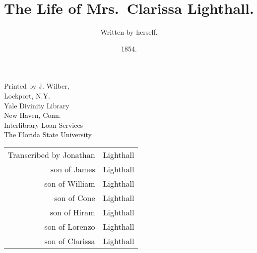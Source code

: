 \documentclass{article}
\title{The Life of Mrs.\ Clarissa Lighthall.}
\author{Written by herself.}
\date{1854.}
\begin{document}
\maketitle

\noindent Printed by J. Wilber,\\
Lockport, N.Y.\\

\noindent %
Yale Divinity Library\\
New Haven, Conn.\\

\noindent %
Interlibrary Loan Services\\
The Florida State University\\%

{\hspace*{-24pt} %
\begin{tabular}{r@{ }l}
Transcribed by Jonathan &Lighthall\\
son of James &Lighthall\\
son of William &Lighthall\\
son of Cone &Lighthall\\
son of Hiram &Lighthall\\
son of Lorenzo &Lighthall\\
son of Clarissa &Lighthall\\
\end{tabular}
}
\end{document}
